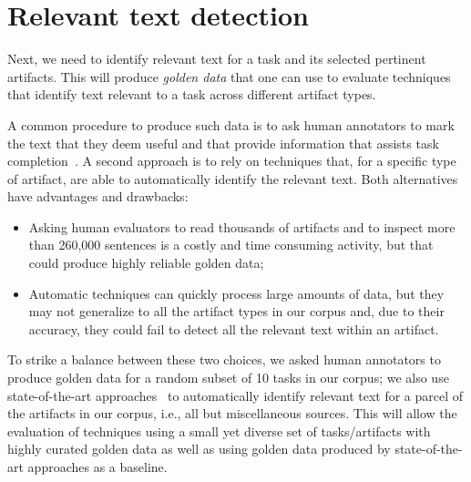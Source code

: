 


\section{Relevant text detection}
\label{cp4:corpus-relevant-text}





Next, we need to identify relevant text for a task and its selected pertinent artifacts.
This will produce \textit{golden data} that one can use to evaluate  
techniques that identify text relevant to a task across different artifact types. 



A common procedure to produce such data is to ask human annotators to
mark the text that they deem useful and that provide information that assists task completion~\cite{nadi2020, Robillard2015, marques2020}.
A second approach is to rely on techniques that, for a specific type of artifact, are able to automatically 
identify the relevant text.
Both alternatives have advantages and drawbacks:


\begin{itemize}
    \item Asking human evaluators to read thousands of artifacts and to inspect more than 260,000 sentences
    is a costly and time consuming activity, but that could produce highly reliable golden data; 
    \item Automatic techniques can quickly process large amounts of data, but they may not generalize to all the artifact types in our corpus and, due to their accuracy, they could fail to detect all the relevant text within an artifact.
\end{itemize}



To strike a balance between these two choices, we asked human annotators to produce golden data for a random subset of 10 tasks in our corpus; we also use state-of-the-art approaches~\cite{nadi2020, Robillard2015, Lotufo2012, Xu2017} to automatically identify relevant text for a parcel of the artifacts in our corpus, i.e., all but miscellaneous sources. 
This will allow the evaluation of techniques using a small yet diverse set of tasks/artifacts with highly curated golden data as well as using golden data produced by state-of-the-art approaches as a baseline.


